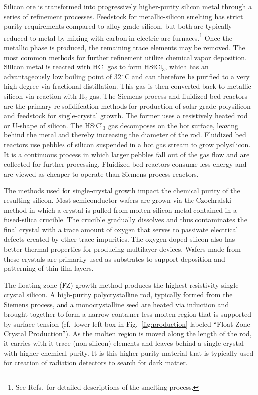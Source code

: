 \documentclass[final,5p]{elsarticle}
\begin{document}
Silicon ore is transformed into progressively higher-purity silicon metal through a series of refinement processes.  Feedstock for metallic-silicon smelting has strict purity requirements compared to alloy-grade silicon, but both are typically reduced to metal by mixing with carbon in electric arc furnaces.\footnote{See Refs.\,\cite{ferrohandbook,aasly} for detailed descriptions of the smelting process.}  Once the metallic phase is produced, the remaining trace elements may be removed. The most common methods for further refinement utilize chemical vapor deposition. Silicon metal is reacted with HCl gas to form HSiCl$_3$, which has an advantageously low boiling point of 32\,$^{\circ}$C and can therefore be purified to a very high degree via fractional distillation. This gas is then converted back to metallic silicon via reaction with H$_2$ gas. The Siemens process and fluidized bed reactors are the primary re-solidifcation methods for production of solar-grade polysilicon and feedstock for single-crystal growth. The former uses a resistively heated rod or U-shape of silicon. The HSiCl$_3$ gas decomposes on the hot surface, leaving behind the metal and thereby increasing the diameter of the rod. Fluidized bed reactors use pebbles of silicon suspended in a hot gas stream to grow polysilicon. It is a continuous process in which larger pebbles fall out of the gas flow and are collected for further processing. Fluidized bed reactors consume less energy and are viewed as cheaper to operate than Siemens process reactors.   

The methods used for single-crystal growth impact the chemical purity of the resulting silicon. Most semiconductor wafers are grown via the Czochralski method \cite{cz,mcz} in which a crystal is pulled from molten silicon metal contained in a fused-silica crucible. The crucible gradually dissolves and thus contaminates the final crystal with a trace amount of oxygen that serves to passivate electrical defects created by other trace impurities. The oxygen-doped silicon also has better thermal properties for producing multilayer devices. Wafers made from these crystals are primarily used as substrates to support deposition and patterning of thin-film layers.

The floating-zone (FZ) growth method \cite{fz} produces the highest-resistivity single-crystal silicon. A high-purity polycrystalline rod, typically formed from the Siemens process, and a monocrystalline seed are heated via induction and brought together to form a narrow container-less molten region that is supported by surface tension (cf.\ lower-left box in Fig.~\ref{fig:production} labeled ``Float-Zone Crystal Production''). As the molten region is moved along the length of the rod, it carries with it trace (non-silicon) elements and leaves behind a single crystal with higher chemical purity.   It is this higher-purity material that is typically used for creation of radiation detectors to search for dark matter.
\end{document}
